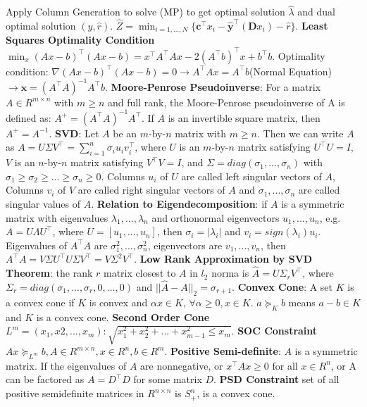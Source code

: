 \documentclass{article}
\begin{document}
Apply Column Generation to solve (MP) to get optimal solution $\hat{\lambda}$ and dual optimal solution $(\hat{y},\hat{r})$. $\hat{Z}=\min_{i=1,...,N}\{\bm{c}^\top x_i-\hat{\bm{y}}^\top (\bm{D}x_i)-\hat{r}\}$.
\textbf{Least Squares Optimality Condition} $\min_{x}(Ax-b)^\top(Ax-b)=x^\top A^\top Ax - 2(A^\top b)^\top x + b^\top b$. Optimality condition: $\nabla(Ax-b)^\top(Ax-b)=0 \to A^\top Ax=A^\top b$(Normal Equation) $\to \bm{x}=(A^\top A)^{-1}A^\top b$.
\textbf{Moore-Penrose Pseudoinverse}: For a matrix $A\in R^{m\times n}$ with $m \ge n$ and full rank, the Moore-Penrose pseudoinverse of A is defined as: $A^{+}=(A^\top A)^{-1}A^\top$. If $A$ is an invertible square matrix, then $A^{+}=A^{-1}$.
\textbf{SVD}: Let $A$ be an $m$-by-$n$ matrix with $m\ge n$. Then we can write $A$ as $A=U\Sigma V^\top=\sum_{i=1}^{n}\sigma_i u_i v_i^\top$, where $U$ is an $m$-by-$n$ matrix satisfying $U^\top U=I$, $V$ is an $n$-by-$n$ matrix satisfying $V^\top V=I$, and $\Sigma=diag(\sigma_1,...,\sigma_n)$ with $\sigma_1 \ge \sigma_2 \ge ...\ge \sigma_n \ge 0$. Columns $u_i$ of $U$ are called left singular vectors of $A$, Columns $v_i$ of $V$ are called right singular vectors of $A$ and $\sigma_1,...,\sigma_n$ are called singular values of $A$.
\textbf{Relation to Eigendecomposition}: if $A$ is a symmetric matrix with eigenvalues $\lambda_1,...,\lambda_n$ and orthonormal eigenvectors $u_1,...,u_n$, e.g. $A=U\Lambda U^\top$, where $U=\left [u_1,...,u_n\right]$, then $\sigma_i=|\lambda_i|$ and $v_i=sign(\lambda_i)u_i$. Eigenvalues of $A^\top A$ are $\sigma_1^2,...,\sigma_n^2$, eigenvectors are $v_1,...,v_n$, then $A^\top A=V\Sigma U^\top U\Sigma V^\top=V \Sigma^{2} V^\top$.
\textbf{Low Rank Approximation by SVD Theorem}: the rank $r$ matrix closest to $A$ in $l_2$ norma is $\hat{A}=U\Sigma_r V^\top$, where $\Sigma_r=diag(\sigma_1,...,\sigma_r,0,...,0)$ and $||\hat{A}-A||_2=\sigma_{r+1}$. 
\textbf{Convex Cone}: A set $K$ is a convex cone if $K$ is convex and $\alpha x \in K$, $\forall \alpha \ge 0, x \in K$. $a \succcurlyeq_K b$ means $a-b \in K$ and $K$ is a convex cone. 
\textbf{Second Order Cone} $L^m={(x_1,x2,...,x_m):\sqrt{x_1^2+x_2^2+...+x_{m-1}^2 \le x_m}}$.
\textbf{SOC Constraint} $Ax \succcurlyeq_{L^{m}} b, A \in R^{m\times n}, x\in R^{n}, b \in R^{m}$.
\textbf{Positive Semi-definite}: $A$ is a symmetric matrix. If the eigenvalues of $A$ are nonnegative, or $x^\top A x \ge 0$ for all $x \in R^{n}$, or A can be factored as $A = D^\top D$ for some matrix $D$.
\textbf{PSD Constraint} set of all positive semidefinite matrices in $R^{n\times n}$ is $S_+^n$, is a convex cone.
\end{document}
